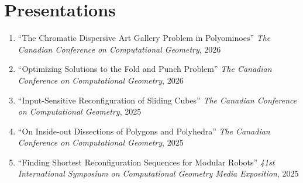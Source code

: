 \documentclass[letterpaper,11pt]{article}
\makeatletter
\newcommand{\resumeSubHeadingListStart}{\begin{itemize}[leftmargin=*]}
\newcommand{\resumeSubheading}[4]{%
  \item[]%
  \begin{tabularx}{\textwidth}{>{\raggedright\arraybackslash}X@{\hspace{0.5em}}r}
    {\bfseries{\textsc{#1}}} & #2 \\[2pt]
    {\small #3}               & {\small #4} \\
  \end{tabularx}%
}
\newcommand{\presentation}[3]{
  \item ``#1'' %
     \emph{#2}, %
      #3%


}
\newcommand{\pdficon}{\faFilePdf}
\makeatother
\begin{document}
\section{Presentations}
\begin{enumerate}
  \presentation{The Chromatic Dispersive Art Gallery Problem in Polyominoes}{The Canadian Conference on Computational Geometry}{2026} \vspace{-.5em}  
  \presentation{Optimizing Solutions to the Fold and Punch Problem}{The Canadian Conference on Computational Geometry}{2026} \vspace{-.5em}  
  \presentation{Input-Sensitive Reconfiguration of Sliding Cubes}{The Canadian Conference on Computational Geometry}{2025} \vspace{-.5em}  
  \presentation{On Inside-out Dissections of Polygons and Polyhedra}{The Canadian Conference on Computational Geometry}{2025} \vspace{-.5em}  
  \presentation{Finding Shortest Reconfiguration Sequences for Modular Robots}{41st International Symposium on Computational Geometry Media Exposition}{2025} \vspace{-.5em}  

\end{enumerate}
\end{document}

